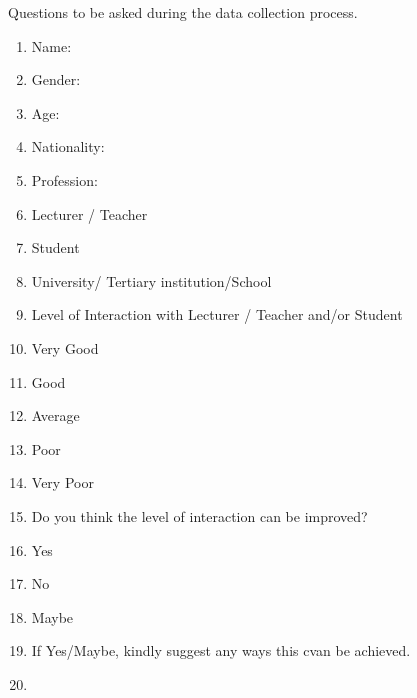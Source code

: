 \documentclass{article} %
\begin{document}
\noindent Questions to be asked during the data collection process. 

\begin{enumerate}
\item  Name:

\item  Gender:

\item  Age:

\item  Nationality:

\item  Profession:

\item  Lecturer / Teacher

\item  Student

\item  University/ Tertiary institution/School

\item  Level of Interaction with Lecturer / Teacher and/or Student

\item  Very Good

\item  Good

\item  Average

\item  Poor

\item  Very Poor

\item  Do you think the level of interaction can be improved? 

\item  Yes

\item  No

\item  Maybe

\item  If Yes/Maybe, kindly suggest any ways this cvan be achieved.

\item  
\end{enumerate}

\noindent 
\end{document}

